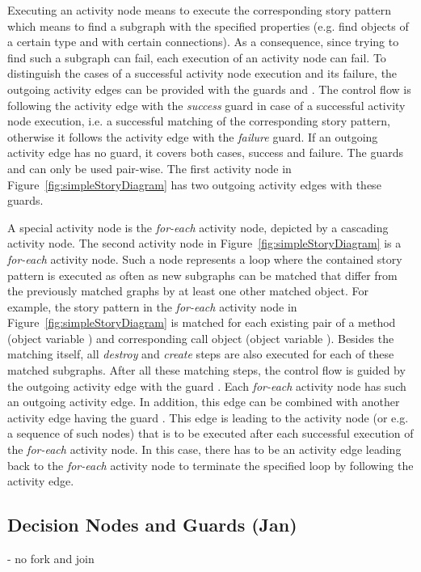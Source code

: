 Executing an activity node means to execute the corresponding story pattern
which means to find a subgraph with the specified properties (e.g. find objects of a certain type and with certain connections).
As a consequence, since trying to find such a subgraph can fail, each execution of an activity node can fail.
To distinguish the cases of a successful activity node execution and its failure,
the outgoing activity edges can be provided with the guards  and .
The control flow is following the activity edge with the \emph{success} guard in case of a successful activity node execution,
i.e. a successful matching of the corresponding story pattern,
otherwise it follows the activity edge with the \emph{failure} guard.
If an outgoing activity edge has no guard, it covers both cases, success and failure.
The guards  and  can only be used pair-wise.
The first activity node in Figure~\ref{fig:simpleStoryDiagram} has two outgoing activity edges with these guards.

A special activity node is the \emph{for-each} activity node, depicted by a cascading activity node.
The second activity node in Figure~\ref{fig:simpleStoryDiagram} is a \emph{for-each} activity node.
Such a node represents a loop where the contained story pattern is executed as often as new subgraphs can be matched
that differ from the previously matched graphs by at least one other matched object.
For example, the story pattern in the \emph{for-each} activity node in Figure~\ref{fig:simpleStoryDiagram}
is matched for each existing pair of a method (object variable ) and corresponding call object (object variable ).
Besides the matching itself, all \emph{destroy} and \emph{create} steps are also executed for each of these matched subgraphs.
After all these matching steps, the control flow is guided by the outgoing activity edge with the guard .
Each \emph{for-each} activity node has such an outgoing activity edge.
In addition, this edge can be combined with another activity edge having the guard .
This edge is leading to the activity node (or e.g. a sequence of such nodes)
that is to be executed after each successful execution of the \emph{for-each} activity node.
In this case, there has to be an activity edge leading back to the \emph{for-each} activity node
to terminate the specified loop by following the  activity edge.



\subsection{Decision Nodes and Guards (Jan)}
- no fork and join

